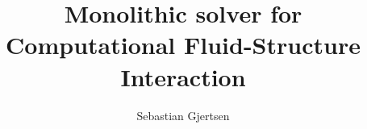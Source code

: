 \documentclass[a4paper, twoside,openright ,titlepage, 12pt]{report}
\title{Monolithic solver for Computational Fluid-Structure Interaction}
\subtitle{}
\author{Sebastian Gjertsen}
\begin{document}
\masterfrontpage


\tableofcontents

\cleardoublepage %


	





%






\begin{appendices}

\end{appendices}
%




\end{document}
